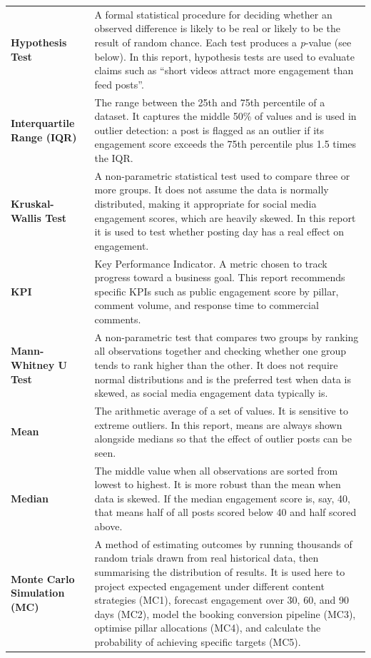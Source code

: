 \begin{longtable}{@{}L{4cm} L{11.5cm}@{}}
\textbf{Hypothesis Test} &
A formal statistical procedure for deciding whether an observed difference is
likely to be real or likely to be the result of random chance. Each test
produces a \textit{p}-value (see below). In this report, hypothesis tests are
used to evaluate claims such as ``short videos attract more engagement than
feed posts''. \\[4pt]

\textbf{Interquartile Range (IQR)} &
The range between the 25th and 75th percentile of a dataset. It captures the
middle 50\% of values and is used in outlier detection: a post is flagged as an
outlier if its engagement score exceeds the 75th percentile plus 1.5 times the IQR. \\[4pt]

\textbf{Kruskal-Wallis Test} &
A non-parametric statistical test used to compare three or more groups. It does
not assume the data is normally distributed, making it appropriate for social
media engagement scores, which are heavily skewed. In this report it is used to
test whether posting day has a real effect on engagement. \\[4pt]

\textbf{KPI} &
Key Performance Indicator. A metric chosen to track progress toward a business
goal. This report recommends specific KPIs such as public engagement score by
pillar, comment volume, and response time to commercial comments. \\[4pt]

\textbf{Mann-Whitney U Test} &
A non-parametric test that compares two groups by ranking all observations
together and checking whether one group tends to rank higher than the other.
It does not require normal distributions and is the preferred test when data
is skewed, as social media engagement data typically is. \\[4pt]

\textbf{Mean} &
The arithmetic average of a set of values. It is sensitive to extreme outliers.
In this report, means are always shown alongside medians so that the effect of
outlier posts can be seen. \\[4pt]

\textbf{Median} &
The middle value when all observations are sorted from lowest to highest.
It is more robust than the mean when data is skewed. If the median engagement
score is, say, 40, that means half of all posts scored below 40 and half scored
above. \\[4pt]

\textbf{Monte Carlo Simulation (MC)} &
A method of estimating outcomes by running thousands of random trials drawn from
real historical data, then summarising the distribution of results. It is used
here to project expected engagement under different content strategies (MC1),
forecast engagement over 30, 60, and 90 days (MC2), model the booking conversion
pipeline (MC3), optimise pillar allocations (MC4), and calculate the probability
of achieving specific targets (MC5). \\[4pt]


\end{longtable}
